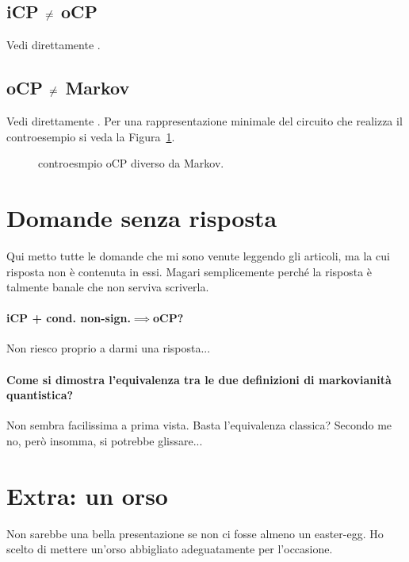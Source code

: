 \documentclass[a4]{article}
\begin{document}
\subsection[iCP non è equivalente a oCP]
           {iCP \(\centernot=\) oCP} \label{cont:icpocp}
Vedi direttamente \cite{CPdoesnotimply}.

\subsection[oCP non è equivalente a Markoviano]
           {oCP \(\centernot=\) Markov} \label{cont:ocpmar}
Vedi direttamente \cite{CPdoesnotimply}. Per una rappresentazione minimale del
circuito che realizza il controesempio si veda la Figura~\ref{fig:oCPMarkov}.
\begin{figure}
	\centering
	\resizebox{0.6\textwidth}{!}{}
	\caption{controesmpio oCP diverso da Markov.}
	\label{fig:oCPMarkov}
\end{figure}

\section{Domande senza risposta}
Qui metto tutte le domande che mi sono venute leggendo gli articoli, ma la cui risposta
non è contenuta in essi. Magari semplicemente perché la risposta è talmente
banale che non serviva scriverla.
\paragraph{iCP + cond. non-sign.\(\implies\)oCP?} 
Non riesco proprio a darmi una risposta...

\paragraph{Come si dimostra l'equivalenza tra le due definizioni di markovianità quantistica?}
Non sembra facilissima a prima vista. Basta l'equivalenza classica? Secondo me no, però
insomma, si potrebbe glissare... 

\printbibliography

\clearpage
\section{Extra: un orso}
Non sarebbe una bella presentazione se non ci fosse almeno un easter-egg. Ho scelto
di mettere un'orso abbigliato adeguatamente per l'occasione.
~
\begin{figure}[h!]
	\centering
	\resizebox{0.9\textwidth}{!}{}
\end{figure}
\end{document}
